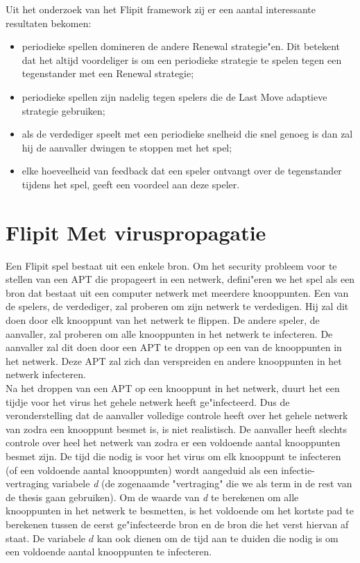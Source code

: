 \documentclass[master=cws, masteroption=vs,english]{kulemt}
\begin{document}
\begin{abstract*}
Uit het onderzoek van het Flipit framework zij er een aantal interessante resultaten bekomen:
\begin{itemize}
\item periodieke spellen domineren de andere Renewal strategie"en. Dit betekent dat het altijd voordeliger is om een periodieke strategie te spelen tegen een tegenstander met een Renewal strategie;
\item periodieke spellen zijn nadelig tegen spelers die de Last Move adaptieve strategie gebruiken;
\item als de verdediger speelt met een periodieke snelheid die snel genoeg is dan zal hij de aanvaller dwingen te stoppen met het spel;
\item elke hoeveelheid van feedback dat een speler ontvangt over de tegenstander tijdens het spel, geeft een voordeel aan deze speler.
\end{itemize}


\section {Flipit Met viruspropagatie}
\label{ch: flipitvirus}
Een Flipit spel bestaat uit een enkele bron. Om het security probleem voor te stellen van een APT die propageert in een netwerk, defini"eren we het spel als een bron dat bestaat uit een computer netwerk met meerdere knooppunten. Een van de spelers, de verdediger, zal proberen om zijn netwerk te verdedigen. Hij zal dit doen door elk knooppunt van het netwerk te flippen. De andere speler, de aanvaller, zal proberen om alle knooppunten in het netwerk te infecteren. De aanvaller zal dit doen door een APT te droppen op een van de knooppunten in het netwerk. Deze APT zal zich dan verspreiden en andere knooppunten in het netwerk infecteren. \\

Na het droppen van een APT op een knooppunt in het netwerk, duurt het een tijdje voor het virus het gehele netwerk heeft ge"infecteerd. Dus de veronderstelling dat de aanvaller volledige controle heeft over het gehele netwerk van zodra een knooppunt besmet is, is niet realistisch. De aanvaller heeft slechts controle over heel het netwerk van zodra er een voldoende aantal knooppunten besmet zijn.
De tijd die nodig is voor het virus om elk knooppunt te infecteren (of een voldoende aantal knooppunten) wordt
aangeduid als een infectie-vertraging variabele \textit{d} (de zogenaamde "vertraging" die we als term in de rest van de thesis gaan gebruiken). Om de waarde van \textit{d} te berekenen om alle knooppunten in het netwerk te besmetten, is het voldoende om het kortste pad te berekenen tussen de eerst ge"infecteerde bron en de bron die het verst hiervan af staat. De variabele $ d $ kan ook dienen om de tijd aan te duiden die nodig is om een voldoende aantal knooppunten te infecteren.\\


\end{abstract*}
\end{document}
